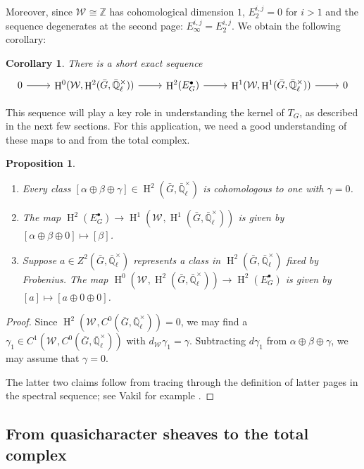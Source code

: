 \documentclass{amsart}
\theoremstyle{plain}
\newtheorem{proposition}[theorem]{Proposition}
\newtheorem{corollary}[theorem]{Corollary}
\theoremstyle{definition}
\theoremstyle{remark}
\newcommand{\ZZ}{{\mathbb{Z}}}
\newcommand{\EE}{\mathbb{\bar Q}_\ell}
\newcommand{\EEx}{\EE^\times}
\newcommand{\Weil}[1]{\mathcal{W}_{#1}}
\DeclareMathOperator{\Hh}{H}
\begin{document}
Moreover, since $\Weil{} \cong \ZZ$ has cohomological dimension $1$, $E_2^{i,j} = 0$ for $i > 1$ and the sequence degenerates at the second page: $E_{\infty}^{i,j} = E_2^{i,j}$. We obtain the following corollary:

\begin{corollary}
There is a short exact sequence
 \[
  \begin{tikzcd}
    0 \arrow{r}
    & \Hh^0(\Weil{},\Hh^2({\bar G},\EEx)) \arrow{r}
    & \Hh^2(E^\bullet_G) \arrow{r}
    & \Hh^1(\Weil{},\Hh^1({\bar G},\EEx)) \arrow{r}
    & 0
  \end{tikzcd}
 \]
\end{corollary}

This sequence will play a key role in understanding the kernel of $T_G$, as described in the next few sections.
For this application, we need a good understanding of these maps to and from the total complex.

\begin{proposition} \label{prop:ses_desc}
\begin{enumerate}
\item Every class $[\alpha\oplus\beta\oplus\gamma] \in \Hh^2({\bar G},\EEx)$ is cohomologous to one with $\gamma=0$.
\item The map $\Hh^2(E^\bullet_G) \to \Hh^1(\Weil{},\Hh^1({\bar G},\EEx))$ is given by $[\alpha\oplus\beta\oplus 0] \mapsto [\beta]$.
\item Suppose $a \in Z^2({\bar G}, \EEx)$ represents a class in $\Hh^2({\bar G},\EEx)$ fixed by Frobenius.
The map $\Hh^0(\Weil{},\Hh^2({\bar G},\EEx)) \to \Hh^2(E^\bullet_G)$ is given by $[a] \mapsto [a \oplus 0 \oplus 0]$.
\end{enumerate}
\end{proposition}
\begin{proof}
Since $\Hh^2(\Weil{}, C^0({\bar G}, \EEx)) = 0$, we may find a $\gamma_1 \in C^1(\Weil{}, C^0({\bar G}, \EEx))$ with $d_{\Weil{}}\gamma_1 = \gamma$.
Subtracting $d \gamma_1$ from $\alpha\oplus\beta\oplus\gamma$, we may assume that $\gamma = 0$.

The latter two claims follow from tracing through the definition of latter pages in the spectral sequence; see Vakil \cite{} for example .
\end{proof}

\subsection{From quasicharacter sheaves to the total complex}\label{ssec:S}
\end{document}
